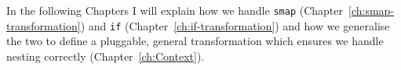 In the following Chapters I will explain how we handle \texttt{smap} (Chapter~\ref{ch:smap-transformation}) and \texttt{if} (Chapter~\ref{ch:if-transformation}) and how we generalise the two to define a pluggable, general transformation which ensures we handle nesting correctly (Chapter~\ref{ch:Context}).

